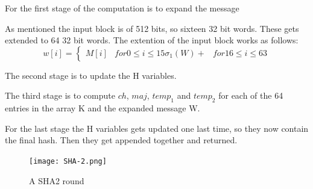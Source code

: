 \documentclass[a4paper]{article}
\begin{document}
For the first stage of the computation is to expand the message

As mentioned the input block is of 512 bits, so sixteen 32 bit words. These gets extended to 64 32 bit words.
The extention of the input block works as follows:
\begin{equation}
  w[i] =
  \begin{cases}
    M[i]  &for 0 \leq i \leq 15
    \sigma_1(W) +  &for 16 \leq i \leq 63
  \end{cases}
\end{equation}

The second stage is to update the H variables.

The third stage is to compute \(ch\), \(maj\), \(temp_1\) and \(temp_2\) for each of the 64 entries in the array K and the expanded message W.

For the last stage the H variables gets updated one last time, so they now contain the final hash. Then they get appended together and returned.

\begin{figure}[H]
\centering
\texttt{[image: SHA-2.png]}
\caption{A SHA2 round}
\label{fig:SHA2Round}
\end{figure}
\end{document}
